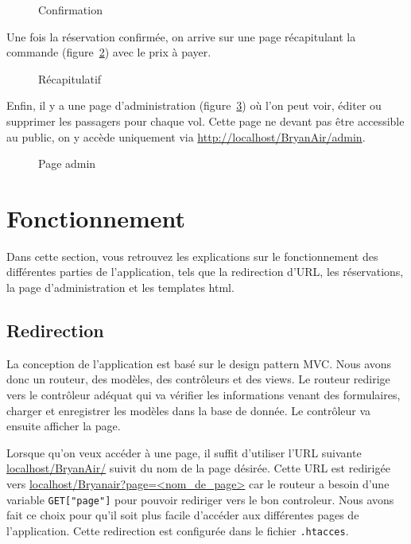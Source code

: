 \documentclass[12pt,a4paper]{article}
\begin{document}
		\begin{figure}
			\caption{Confirmation}
			\label{fig:conf}
		\end{figure}
		Une fois la réservation confirmée, on arrive sur une page récapitulant la commande (figure~\ref{fig:recap}) avec le prix à payer.
		\begin{figure}
			\caption{Récapitulatif}
			\label{fig:recap}
		\end{figure}

		Enfin, il y a une page d'administration (figure~\ref{fig:admin}) où l'on peut voir, éditer ou supprimer les passagers pour chaque vol. Cette page ne devant pas être accessible au public, on y accède uniquement via \url{http://localhost/BryanAir/admin}.

		\begin{figure}
			\caption{Page admin}
			\label{fig:admin}
		\end{figure}

	\section{Fonctionnement}
		Dans cette section, vous retrouvez les explications sur le fonctionnement des différentes parties de l'application, tels que la redirection d'URL, les réservations, la page d'administration et les templates html.
		\subsection*{Redirection}
		La conception de l'application est basé sur le design pattern MVC. Nous avons donc un routeur, des modèles, des contrôleurs et des views. Le routeur redirige vers le contrôleur adéquat qui va vérifier les informations venant des formulaires, charger et enregistrer les modèles dans la base de donnée. Le contrôleur va ensuite afficher la page.

		Lorsque qu'on veux accéder à une page, il suffit d'utiliser l'URL suivante \url{localhost/BryanAir/} suivit du nom de la page désirée. Cette URL est redirigée vers \url{localhost/Bryanair?page=<nom_de_page>} car le routeur a besoin d'une variable \texttt{GET["page"]} pour pouvoir rediriger vers le bon controleur. Nous avons fait ce choix pour qu'il soit plus facile d'accéder aux différentes pages de l'application. Cette redirection est configurée dans le fichier \texttt{.htacces}.
\end{document}
